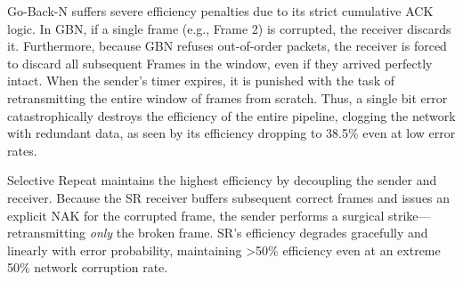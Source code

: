 \documentclass[12pt]{article}
\begin{document}
Go-Back-N suffers severe efficiency penalties due to its strict cumulative ACK logic. In GBN, if a single frame (e.g., Frame 2) is corrupted, the receiver discards it. Furthermore, because GBN refuses out-of-order packets, the receiver is forced to discard all subsequent Frames in the window, even if they arrived perfectly intact. When the sender's timer expires, it is punished with the task of retransmitting the entire window of frames from scratch. Thus, a single bit error catastrophically destroys the efficiency of the entire pipeline, clogging the network with redundant data, as seen by its efficiency dropping to 38.5\% even at low error rates.

Selective Repeat maintains the highest efficiency by decoupling the sender and receiver. Because the SR receiver buffers subsequent correct frames and issues an explicit NAK for the corrupted frame, the sender performs a surgical strike---retransmitting \textit{only} the broken frame. SR's efficiency degrades gracefully and linearly with error probability, maintaining >50\% efficiency even at an extreme 50\% network corruption rate.

\begin{table}[H]
\centering
{}
\caption{Efficiency and Avg RTT under varying Error Probabilities}
\end{table}
\end{document}
